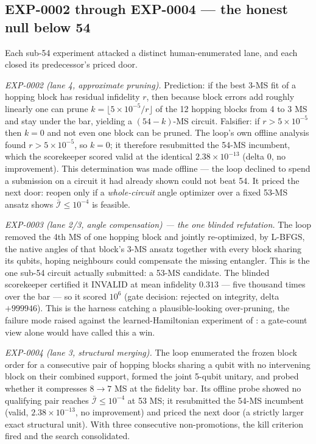 \documentclass[11pt]{article}
\begin{document}
\subsection{EXP-0002 through EXP-0004 --- the honest null below 54}

Each sub-54 experiment attacked a distinct human-enumerated lane, and each closed
its predecessor's priced door.

\emph{EXP-0002 (lane 4, approximate pruning).} Prediction: if the best 3-MS fit of a
hopping block has residual infidelity $r$, then because block errors add roughly
linearly one can prune $k = \lfloor 5\times10^{-5}/r \rfloor$ of the 12 hopping
blocks from 4 to 3 MS and stay under the bar, yielding a $(54-k)$-MS circuit.
Falsifier: if $r > 5\times10^{-5}$ then $k=0$ and not even one block can be pruned.
The loop's own offline analysis found $r > 5\times10^{-5}$, so $k=0$; it therefore
resubmitted the 54-MS incumbent, which the scorekeeper scored valid at the identical
$2.38\times10^{-13}$ (delta $0$, no improvement). This determination was made offline
--- the loop declined to spend a submission on a circuit it had already shown could not
beat 54. It priced the next door: reopen only if a \emph{whole-circuit} angle
optimizer over a fixed 53-MS ansatz shows $\bar{\mathcal{I}}\le10^{-4}$ is feasible.

\emph{EXP-0003 (lane 2/3, angle compensation) --- the one blinded refutation.} The loop
removed the 4th MS of one hopping block and jointly re-optimized, by L-BFGS, the
native angles of that block's 3-MS ansatz together with every block sharing its
qubits, hoping neighbours could compensate the missing entangler. This is the one
sub-54 circuit actually submitted: a 53-MS candidate. The blinded scorekeeper
certified it INVALID at mean infidelity $0.313$ --- five thousand times over the bar
--- so it scored $10^{6}$ (gate decision: rejected on integrity, delta $+999946$).
This is the harness catching a plausible-looking over-pruning, the failure mode
raised against the learned-Hamiltonian experiment of \cite{Jafferis2022}: a
gate-count view alone would have called this a win.

\emph{EXP-0004 (lane 3, structural merging).} The loop enumerated the frozen block
order for a consecutive pair of hopping blocks sharing a qubit with no intervening
block on their combined support, formed the joint 5-qubit unitary, and probed
whether it compresses $8\to7$ MS at the fidelity bar. Its offline probe showed no
qualifying pair reaches $\bar{\mathcal{I}}\le10^{-4}$ at 53 MS; it resubmitted the
54-MS incumbent (valid, $2.38\times10^{-13}$, no improvement) and priced the next
door (a strictly larger exact structural unit). With three consecutive
non-promotions, the kill criterion fired and the search consolidated.
\end{document}
